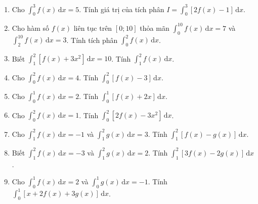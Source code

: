 \documentclass[12pt]{article}
\begin{document}
	\begin{enumerate}[label=\textbf{Câu \arabic*.}]
		\item Cho $\displaystyle \int_0^3 f(x)\,\mathrm{d}x = 5$. Tính giá trị của tích phân $I = \displaystyle \int_0^3 [2f(x) - 1]\,\mathrm{d}x$.
		\vspace{0.75cm}
		
		\item Cho hàm số $f(x)$ liên tục trên $[0; 10]$ thỏa mãn $\displaystyle \int_0^{10} f(x)\,\mathrm{d}x = 7$ và $\displaystyle \int_2^{10} f(x)\,\mathrm{d}x = 3$. Tính tích phân $\displaystyle \int_0^2 f(x)\,\mathrm{d}x$.
		\vspace{0.75cm}
	
		\item Biết $\displaystyle \int_1^2 [f(x)+3x^2]\,\mathrm{d}x = 10$. Tính $\displaystyle \int_1^2 f(x)\,\mathrm{d}x$.
		\vspace{0.75cm}
		
		\item Cho $\displaystyle \int_0^2 f(x)\,\mathrm{d}x = 4$. Tính $\displaystyle \int_0^2 [f(x)-3]\,\mathrm{d}x$.
		\vspace{0.75cm}
		
		\item Cho $\displaystyle \int_0^1 f(x)\,\mathrm{d}x = 2$. Tính $\displaystyle \int_0^1 [f(x)+2x]\,\mathrm{d}x$.
		\vspace{0.75cm}
		
		\item Cho $\displaystyle \int_0^2 f(x)\,\mathrm{d}x = 1$. Tính $\displaystyle \int_0^2 [2f(x)-3x^2]\,\mathrm{d}x$.
		\vspace{0.75cm}
		
		\item Cho $\displaystyle \int_1^2 f(x)\,\mathrm{d}x = -1$ và $\displaystyle \int_1^2 g(x)\,\mathrm{d}x = 3$. Tính $\displaystyle \int_1^2 [f(x)-g(x)]\,\mathrm{d}x$.
		\vspace{0.75cm}
		
		\item Biết $\displaystyle \int_1^2 f(x)\,\mathrm{d}x = -3$ và $\displaystyle \int_1^2 g(x)\,\mathrm{d}x = 2$. Tính $\displaystyle \int_1^2 [3f(x)-2g(x)]\,\mathrm{d}x$.
		\vspace{0.75cm}
		
		\item Cho $\displaystyle \int_0^1 f(x)\,\mathrm{d}x = 2$ và $\displaystyle \int_0^1 g(x)\,\mathrm{d}x = -1$. Tính $\displaystyle \int_0^1 [x+2f(x)+3g(x)]\,\mathrm{d}x$.
		\vspace{0.75cm}
		

\end{enumerate}
\end{document}
